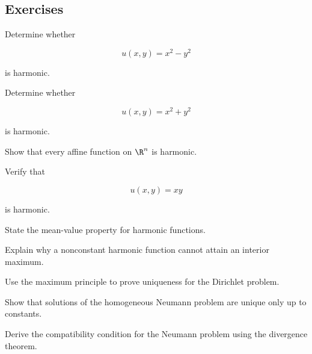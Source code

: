 \subsection{Exercises}
\label{subsec:potential-theory-exercises}

\begin{exercise}[1]
Determine whether

\[
u(x,y)=x^2-y^2
\]

is harmonic.
\end{exercise}

\begin{exercise}[1]
Determine whether

\[
u(x,y)=x^2+y^2
\]

is harmonic.
\end{exercise}

\begin{exercise}[1]
Show that every affine function on \(\R^n\) is harmonic.
\end{exercise}

\begin{exercise}[1]
Verify that

\[
u(x,y)=xy
\]

is harmonic.
\end{exercise}

\begin{exercise}[1]
State the mean-value property for harmonic functions.
\end{exercise}

\begin{exercise}[1]
Explain why a nonconstant harmonic function cannot attain an interior
maximum.
\end{exercise}

\begin{exercise}[2]
Use the maximum principle to prove uniqueness for the Dirichlet problem.
\end{exercise}

\begin{exercise}[2]
Show that solutions of the homogeneous Neumann problem are unique only up
to constants.
\end{exercise}

\begin{exercise}[2]
Derive the compatibility condition for the Neumann problem using the
divergence theorem.
\end{exercise}

